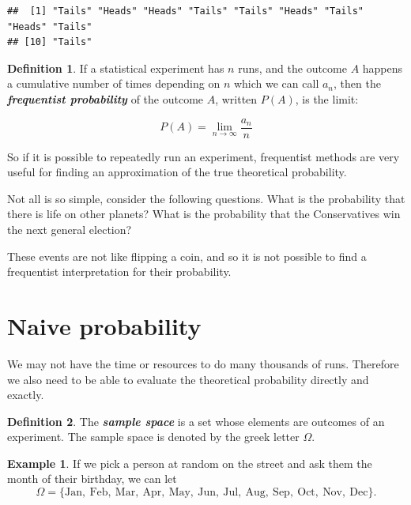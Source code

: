 \documentclass[
]{book}
\theoremstyle{definition}
\newtheorem{definition}{Definition}[chapter]
\theoremstyle{definition}
\newtheorem{example}{Example}[chapter]
\theoremstyle{definition}
\theoremstyle{definition}
\theoremstyle{remark}
\begin{document}
\begin{verbatim}
##  [1] "Tails" "Heads" "Heads" "Tails" "Tails" "Heads" "Tails" "Heads" "Tails"
## [10] "Tails"
\end{verbatim}

\begin{definition}
\protect\hypertarget{def:freq}{}\label{def:freq}If a statistical experiment has \(n\) runs, and the outcome \(A\) happens a cumulative number of times depending on \(n\) which we can call \(a_n\), then the \textbf{\emph{frequentist probability}} of the outcome \(A\), written \(P(A)\), is the limit:

\[P(A) = \lim_{n\to \infty} \frac{a_n}{n}\]
\end{definition}

So if it is possible to repeatedly run an experiment, frequentist methods are very useful for finding an approximation of the true theoretical probability.

Not all is so simple, consider the following questions. What is the probability that there is life on other planets? What is the probability that the Conservatives win the next general election?

These events are not like flipping a coin, and so it is not possible to find a frequentist interpretation for their probability.

\hypertarget{naive-probability}{%
\section{Naive probability}\label{naive-probability}}

We may not have the time or resources to do many thousands of runs. Therefore we also need to be able to evaluate the theoretical probability directly and exactly.

\begin{definition}
\protect\hypertarget{def:samplespace}{}\label{def:samplespace}The \textbf{\emph{sample space}} is a set whose elements are outcomes of an experiment. The sample space is denoted by the greek letter \(\Omega\).
\end{definition}

\begin{example}
\protect\hypertarget{exm:monthspace}{}\label{exm:monthspace}If we pick a person at random on the street and ask them the month of their birthday,
we can let
\[\Omega = \{\text{Jan}, \ \text{Feb}, \ \text{Mar},  \ \text{Apr}, \ \text{May}, \ \text{Jun}, \ \text{Jul}, \ \text{Aug}, \ \text{Sep}, \ \text{Oct}, \ \text{Nov}, \ \text{Dec} \}.\]
\end{example}
\end{document}
